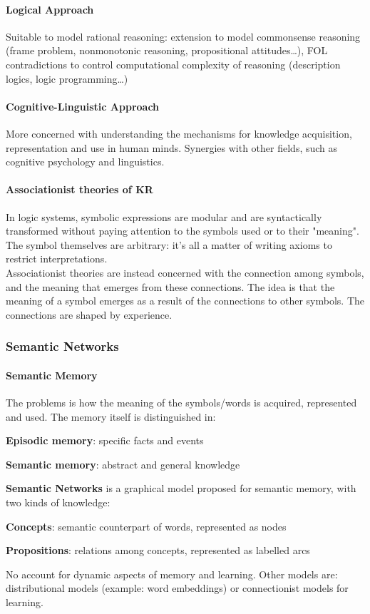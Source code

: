 \documentclass[10pt]{report}
\begin{document}
\paragraph{Logical Approach} Suitable to model rational reasoning: extension to model commonsense reasoning (frame problem, nonmonotonic reasoning, propositional attitudes\ldots), FOL contradictions to control computational complexity of reasoning (description logics, logic programming\ldots)
\paragraph{Cognitive-Linguistic Approach} More concerned with understanding the mechanisms for knowledge acquisition, representation and use in human minds. Synergies with other fields, such as cognitive psychology and linguistics.
\paragraph{Associationist theories of KR} In logic systems, symbolic expressions are modular and are syntactically transformed without paying attention to the symbols used or to their "meaning". The symbol themselves are arbitrary: it's all a matter of writing axioms to restrict interpretations.\\
Associationist theories are instead concerned with the connection among symbols, and the meaning that emerges from these connections. The idea is that the meaning of a symbol emerges as a result of the connections to other symbols. The connections are shaped by experience.
\subsubsection{Semantic Networks}
\paragraph{Semantic Memory} The problems is how the meaning of the symbols/words is acquired, represented and used. The memory itself is distinguished in:
\begin{list}{}{}
	\item \textbf{Episodic memory}: specific facts and events
	\item \textbf{Semantic memory}: abstract and general knowledge
\end{list}
\textbf{Semantic Networks} is a graphical model proposed for semantic memory, with two kinds of knowledge:
\begin{list}{}{}
	\item \textbf{Concepts}: semantic counterpart of words, represented as nodes
	\item \textbf{Propositions}: relations among concepts, represented as labelled arcs
\end{list}
No account for dynamic aspects of memory and learning. Other models are: distributional models (example: word embeddings) or connectionist models for learning.
\end{document}
